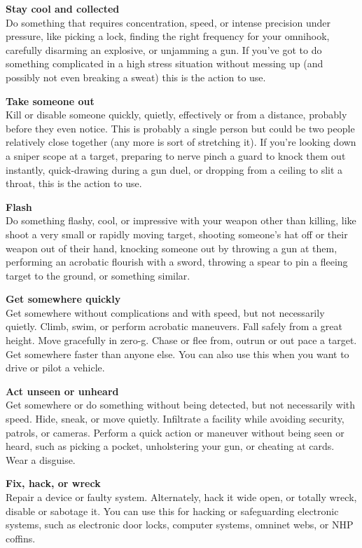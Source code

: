 \textbf{Stay cool and collected}\\
Do something that requires concentration, speed, or intense precision under pressure, like picking a lock, finding the right frequency for your omnihook, carefully disarming an explosive, or unjamming a gun. If you've got to do something complicated in a high stress situation without messing up (and possibly not even breaking a sweat) this is the action to use. 

\textbf{Take someone out}\\
Kill or disable someone quickly, quietly, effectively or from a distance, probably before they even notice. This is probably a single person but could be two people relatively close together (any more is sort of stretching it). If you're looking down a sniper scope at a target, preparing to nerve pinch a guard to knock them out instantly, quick-drawing during a gun duel, or dropping from a ceiling to slit a throat, this is the action to use.

\textbf{Flash}\\
Do something flashy, cool, or impressive with your weapon other than killing, like shoot a very small or rapidly moving target, shooting someone's hat off or their weapon out of their hand, knocking someone out by throwing a gun at them, performing an acrobatic flourish with a sword, throwing a spear to pin a fleeing target to the ground, or something similar.

\textbf{Get somewhere quickly}\\
Get somewhere without complications and with speed, but not necessarily quietly. Climb, swim, or perform acrobatic maneuvers. Fall safely from a great height. Move gracefully in zero-g. Chase or flee from, outrun or out pace a target. Get somewhere faster than anyone else. You can also use this when you want to drive or pilot a vehicle.

\textbf{Act unseen or unheard}\\
Get somewhere or do something without being detected, but not necessarily with speed. Hide, sneak, or move quietly. Infiltrate a facility while avoiding security, patrols, or cameras. Perform a quick action or maneuver without being seen or heard, such as picking a pocket, unholstering your gun, or cheating at cards. Wear a disguise.

\textbf{Fix, hack, or wreck}\\
Repair a device or faulty system. Alternately, hack it wide open, or totally wreck, disable or sabotage it. You can use this for hacking or safeguarding electronic systems, such as electronic door locks, computer systems, omninet webs, or NHP coffins.

